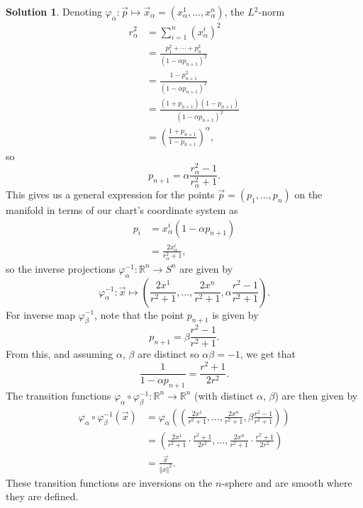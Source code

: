 \documentclass[11pt, a4paper]{article}
\newcommand*{\norm}[1]{\ensuremath{\left\Vert#1\right\Vert}}
\theoremstyle{definition}
\newtheorem{sol}{Solution}[part]
\begin{document}
\begin{sol}
Denoting $\varphi_\alpha: \vec{p} \mapsto \vec{x}_\alpha = \left(x_\alpha^1, \ldots, x_\alpha^n\right)$, the $L\!^2$-norm
\begin{align*}
    r_\alpha^2 &= \sum_{i = 1}^n {(x_\alpha^i)}^2 \\
               &= \frac{p_1^2 + \cdots + p_n^2}{{(1 - \alpha p_{n + 1})}^2} \\
               &= \frac{1 - p_{n + 1}^2}{{(1 - \alpha p_{n + 1})}^2} \\
               &= \frac{(1 + p_{n + 1})(1 - p_{n + 1})}{{(1 - \alpha p_{n + 1})}^2} \\
               &= {\left(\frac{1 + p_{n + 1}}{1 - p_{n + 1}}\right)}^\alpha,
\end{align*}
so
\[
    p_{n + 1} = \alpha\frac{r_\alpha^2 - 1}{r_\alpha^2 + 1}.
\]
This gives us a general expression for the points $\vec{p} = (p_1, \ldots, p_n)$ on the manifold in terms of our chart's coordinate system as
\begin{align*}
    p_i &= x_\alpha^i (1 - \alpha p_{n + 1}) \\
        &= \frac{2 x_\alpha^i}{r_\alpha^2 + 1},
\end{align*}
so the inverse projections $\varphi_\alpha^{-1}: \mathbb{R}^n \to S^n$ are given by
\[
    \varphi_\alpha^{-1}: \vec{x} \mapsto \left(\frac{2 x^1}{r^2 + 1}, \ldots, \frac{2 x^n}{r^2 + 1}, \alpha \frac{r^2 - 1}{r^2 + 1} \right).
\]
For inverse map $\varphi_\beta^{-1}$, note that the point $p_{n + 1}$ is given by
\[
    p_{n + 1} = \beta \frac{r^2 - 1}{r^2 + 1}.
\]
From this, and assuming $\alpha$, $\beta$ are distinct so $\alpha \beta = -1$, we get that
\[
    \frac{1}{1 - \alpha p_{n + 1}} = \frac{r^2 + 1}{2 r^2}.
\]
The transition functions $\varphi_\alpha \circ \varphi_\beta^{-1}: \mathbb{R}^n \to \mathbb{R}^n$ (with distinct $\alpha$, $\beta$) are then given by
\begin{align*}
    \varphi_\alpha \circ \varphi_\beta^{-1} (\vec{x}) &= \varphi_\alpha \left(\left(\frac{2 x^1}{r^2 + 1}, \ldots, \frac{2 x^n}{r^2 + 1}, \beta \frac{r^2 - 1}{r^2 + 1} \right)\right) \\
        &= \left(\frac{2 x^1}{r^2 + 1} \cdot \frac{r^2 + 1}{2 r^2},
                 \ldots,
                 \frac{2 x^n}{r^2 + 1} \cdot \frac{r^2 + 1}{2 r^2}
            \right) \\
        &= \frac{\vec{x}}{\norm{x}^2}.
\end{align*}
These transition functions are inversions on the $n$-sphere and are smooth where they are defined.

\end{sol}
\end{document}

